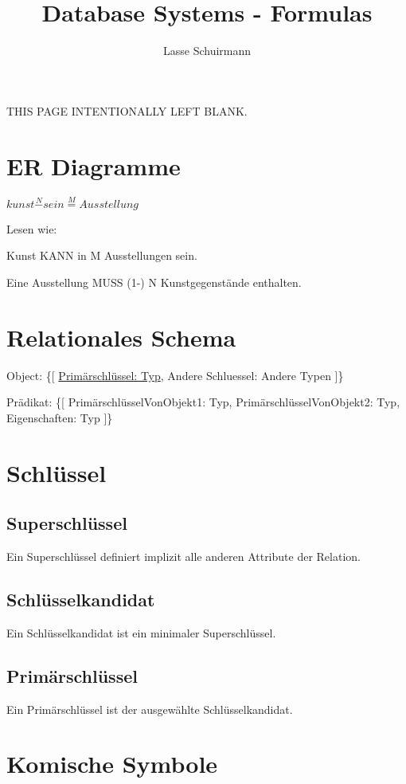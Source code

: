 \documentclass[10pt,a4paper,oneside]{report}
\title{Database Systems - Formulas}
\author{Lasse Schuirmann}
\newcommand*{\blankpage}{
  \vspace*{\fill}
  \begin{flushright}
  \tiny THIS PAGE INTENTIONALLY LEFT BLANK.
  \end{flushright}
  \pagebreak
}
\begin{document}
\maketitle

\pagebreak

\blankpage

\section*{ER Diagramme}

$kunst \overset{N}{-} sein \overset{M}{=} Ausstellung$

Lesen wie:

Kunst KANN in M Ausstellungen sein.

Eine Ausstellung MUSS (1-) N Kunstgegenstände enthalten.

\section*{Relationales Schema}

Object: \{[ \underline{Primärschlüssel: Typ}, Andere Schluessel: Andere Typen ]\}

Prädikat: \{[ PrimärschlüsselVonObjekt1: Typ, PrimärschlüsselVonObjekt2: Typ, Eigenschaften: Typ ]\}

\section*{Schlüssel}

\subsection*{Superschlüssel}

Ein Superschlüssel definiert implizit alle anderen Attribute der Relation.

\subsection*{Schlüsselkandidat}

Ein Schlüsselkandidat ist ein minimaler Superschlüssel.

\subsection*{Primärschlüssel}

Ein Primärschlüssel ist der ausgewählte Schlüsselkandidat.

\section*{Komische Symbole}
\end{document}
